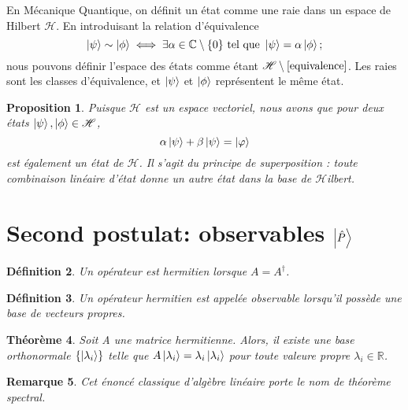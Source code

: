 \documentclass[11pt,twoside,a4paper]{report}
\numberwithin{equation}{part}
\newtheorem{theorem}{Théorème}[section]
\newtheorem{definition}[theorem]{Définition}
\newtheorem{property}[theorem]{Proposition}
\newtheorem{remark}[theorem]{Remarque}
\begin{document}
En Mécanique Quantique, on définit un état comme une raie dans un espace de Hilbert $\mathcal{H}$. En introduisant la relation d'équivalence
\begin{equation}
\label{eq:equivalence}
    \ket{\psi} \sim \ket{\phi} \iff \exists \alpha\in\mathbb{C}\setminus\{0\} \text{ tel que } \ket{\psi}=\alpha\ket{\phi} ;
\end{equation}
nous pouvons définir l'espace des états comme étant $\mathcal{H}\setminus\ref{equivalence}$. Les raies sont les classes d'équivalence, et $\ket{\psi}$ et $\ket{\phi}$ représentent le même état.\\

\begin{property}
    Puisque $\mathcal{H}$ est un espace vectoriel, nous avons que pour deux états $\ket{\psi},\ket{\phi} \in\mathcal{H}$, 
    \begin{equation}
        \alpha\ket{\psi}+\beta\ket{\psi}=\ket{\varphi}
    \end{equation}
    est également un état de $\mathcal{H}$. Il s'agit du principe de superposition : toute combinaison linéaire d'état donne un autre état dans la base de $\mathcal{H}$ilbert.
    \label{Superposition}
\end{property}

\section{Second postulat: observables $\ket{\hat{P}}$}

\begin{definition}
    Un opérateur est hermitien lorsque $A=A^\dagger$.
\end{definition}

\begin{definition}
    Un opérateur hermitien est appelée observable lorsqu'il possède une base de vecteurs propres.
\end{definition}

\begin{theorem}
    Soit A une matrice hermitienne. Alors, il existe une base orthonormale $\{\ket{\lambda_i}\}$ telle que $A\ket{\lambda_i}=\lambda_i\ket{\lambda_i}$ pour toute valeure propre $\lambda_i\in\mathbb{R}$.
\end{theorem}

\begin{remark}
    Cet énoncé classique d'algèbre linéaire porte le nom de théorème spectral.
\end{remark}
\end{document}
